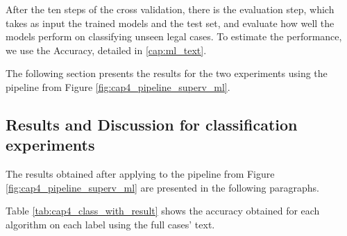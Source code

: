 After the ten steps of the cross validation, there is the evaluation step, which takes as input the trained models and the test set, and evaluate how well the models perform on classifying unseen legal cases. To estimate the performance, we use the Accuracy, detailed in \ref{cap:ml_text}.

The following section presents the results for the two experiments using the pipeline from Figure \ref{fig:cap4_pipeline_superv_ml}.

\subsection{Results and Discussion for classification experiments}


The results obtained after applying to the pipeline from Figure \ref{fig:cap4_pipeline_superv_ml} are presented in the following paragraphs.

Table \ref{tab:cap4_class_with_result} shows the accuracy obtained for each algorithm on each label using the full cases' text.





